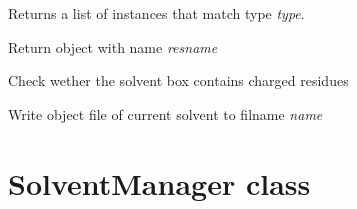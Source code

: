 \documentclass[letterpaper,10pt,english]{sphinxmanual}
\begin{document}
\begin{fulllineitems}
\begin{fulllineitems}
\end{fulllineitems}


\begin{fulllineitems}
\label{solvents:pyMDMix.Solvents.Solvent.getProbesByType}
Returns a list of {\hyperref[containers:pyMDMix.containers.Probe]{}} instances that match type \emph{type}.

\end{fulllineitems}


\begin{fulllineitems}
\label{solvents:pyMDMix.Solvents.Solvent.getResidue}
Return {\hyperref[containers:pyMDMix.containers.Residue]{}} object with name \emph{resname}

\end{fulllineitems}


\begin{fulllineitems}
\label{solvents:pyMDMix.Solvents.Solvent.isIonic}
Check wether the solvent box contains charged residues

\end{fulllineitems}


\begin{fulllineitems}
\label{solvents:pyMDMix.Solvents.Solvent.writeOff}
Write object file of current solvent to filname \emph{name}

\end{fulllineitems}


\end{fulllineitems}



\section{SolventManager class}
\label{solvents:solventmanager-class}
\end{document}
